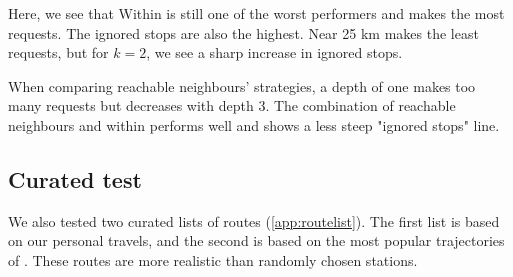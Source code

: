 Here, we see that Within is still one of the worst performers and makes the most requests. The ignored stops are also the highest. Near 25 km makes the least requests, but for $k=2$, we see a sharp increase in ignored stops. 

When comparing reachable neighbours' strategies, a depth of one makes too many requests but decreases with depth 3. The combination of reachable neighbours and within performs well and shows a less steep "ignored stops" line.

\subsection{Curated  test}
We also tested two curated lists of routes (\autoref{app:routelist}). The first list is based on our personal travels, and the second is based on the most popular trajectories of  \cite{noauthor_populairste_nodate}. These routes are more realistic than randomly chosen stations.

